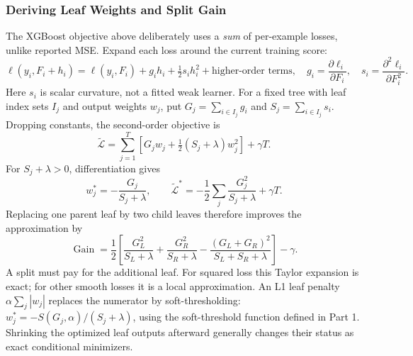 \documentclass[11pt,twoside]{article}
\numberwithin{equation}{section}
\newcommand{\Loss}{\mathcal{L}}
\theoremstyle{plain}
\theoremstyle{definition}
\theoremstyle{remark}
\begin{document}
\subsubsection{Deriving Leaf Weights and Split Gain}
\label{sec:xgb-derivation}
The XGBoost objective above deliberately uses a \emph{sum} of per-example losses, unlike reported MSE. Expand each loss around the current training score:
\[
\ell(y_i,F_i+h_i)=\ell(y_i,F_i)+g_ih_i+\tfrac12s_i h_i^2+\text{higher-order terms},
\quad g_i=\frac{\partial\ell_i}{\partial F_i},\quad s_i=\frac{\partial^2\ell_i}{\partial F_i^2}.
\]
Here $s_i$ is scalar curvature, not a fitted weak learner. For a fixed tree with leaf index sets $I_j$ and output weights $w_j$, put $G_j=\sum_{i\in I_j}g_i$ and $S_j=\sum_{i\in I_j}s_i$. Dropping constants, the second-order objective is
\[
\widetilde{\Loss}=\sum_{j=1}^{T}\left[G_jw_j+\tfrac12(S_j+\lambda)w_j^2\right]+\gamma T.
\]
For $S_j+\lambda>0$, differentiation gives
\[
w_j^*=-\frac{G_j}{S_j+\lambda},\qquad
\widetilde{\Loss}^*=-\frac12\sum_j\frac{G_j^2}{S_j+\lambda}+\gamma T.
\]
Replacing one parent leaf by two child leaves therefore improves the approximation by
\[
\operatorname{Gain}=\frac12\left[\frac{G_L^2}{S_L+\lambda}+\frac{G_R^2}{S_R+\lambda}
-\frac{(G_L+G_R)^2}{S_L+S_R+\lambda}\right]-\gamma.
\]
A split must pay for the additional leaf. For squared loss this Taylor expansion is exact; for other smooth losses it is a local approximation. An L1 leaf penalty $\alpha\sum_j|w_j|$ replaces the numerator by soft-thresholding: $w_j^*=-S(G_j,\alpha)/(S_j+\lambda)$, using the soft-threshold function defined in Part 1. Shrinking the optimized leaf outputs afterward generally changes their status as exact conditional minimizers.
\end{document}
